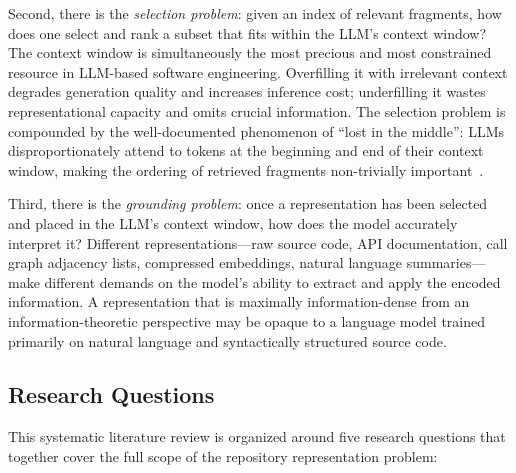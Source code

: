 Second, there is the \emph{selection problem}: given an index of relevant fragments, how does
one select and rank a subset that fits within the LLM's context window? The context window is
simultaneously the most precious and most constrained resource in LLM-based software
engineering. Overfilling it with irrelevant context degrades generation quality and increases
inference cost; underfilling it wastes representational capacity and omits crucial information.
The selection problem is compounded by the well-documented phenomenon of ``lost in the middle'':
LLMs disproportionately attend to tokens at the beginning and end of their context window,
making the ordering of retrieved fragments non-trivially important~\cite{yusuf2025beyond}.

Third, there is the \emph{grounding problem}: once a representation has been selected and
placed in the LLM's context window, how does the model accurately interpret it? Different
representations---raw source code, API documentation, call graph adjacency lists, compressed
embeddings, natural language summaries---make different demands on the model's ability to
extract and apply the encoded information. A representation that is maximally information-dense
from an information-theoretic perspective may be opaque to a language model trained primarily
on natural language and syntactically structured source code.

\subsection{Research Questions}

This systematic literature review is organized around five research questions that together
cover the full scope of the repository representation problem:

